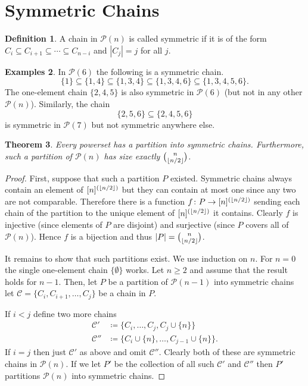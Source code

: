 \documentclass{report}
\DeclarePairedDelimiter\floor{\lfloor}{\rfloor}
\theoremstyle{definition}
\theoremstyle{plain}
\newtheorem{thm}{Theorem}[section]
\theoremstyle{definition}
\newtheorem{defn}[thm]{Definition}
\newtheorem{egs}[thm]{Examples}
\begin{document}
 	\section{Symmetric Chains}
 	\begin{defn}
 		A chain in $\mathcal{P}(n)$ is called symmetric if it is of the form $C_i \subseteq C_{i+1} \subseteq \cdots \subseteq C_{n-i}$ and $|C_j| = j$ for all $j$.
 	\end{defn}
 	\begin{egs}
 		In $\mathcal{P}(6)$ the following is a symmetric chain.
 		\[
 			\{1\} \subseteq \{1,4\}\subseteq \{1,3,4\}\subseteq \{1,3,4,6\}\subseteq \{1,3,4,5,6\}.
 		\]
 		The one-element chain $\{2,4,5\}$ is also symmetric in $\mathcal{P}(6)$ (but not in any other $\mathcal{P}(n)$). Similarly, the chain
 		\[
 			\{2,5,6\} \subseteq \{2,4,5,6\}
 		\]
 		is symmetric in $\mathcal{P}(7)$ but not symmetric anywhere else.
 	\end{egs}
 	\begin{thm}
 		Every powerset has a partition into symmetric chains. Furthermore, such a partition of $\mathcal{P}(n)$ has size exactly $\binom{n}{\floor{n/2}}$.
 	\end{thm}
 	\begin{proof}
 		First, suppose that such a partition $P$ existed. Symmetric chains always contain an element of $[n]^{(\floor{n/2})}$ but they can contain at most one since any two are not comparable. Therefore there is a function $f\colon P \to [n]^{(\floor{n/2})}$ sending each chain of the partition to the unique element of $[n]^{(\floor{n/2})}$ it contains. Clearly $f$ is injective (since elements of $P$ are disjoint) and surjective (since $P$ covers all of $\mathcal{P}(n)$). Hence $f$ is a bijection and thus $|P| = \binom{n}{\floor{n/2}}$.		
 		
 		
 		It remains to show that such partitions exist. We use induction on $n$. For $n = 0$ the single one-element chain $\{\emptyset\}$ works. Let $n\geq 2$ and assume that the result holds for $n-1$. Then, let $P$ be a partition of $\mathcal{P}(n-1)$ into symmetric chains let $\mathcal{C} = \{C_i,C_{i+1},\ldots, C_{j}\}$ be a chain in $P$.
 		
 		If $i<j$ define two more chains
 		\begin{align*}
 			\mathcal{C}'&\coloneqq \{C_i,\ldots,C_j,C_j \cup \{n\}\}\\
 			\mathcal{C}''&\coloneqq \{C_i\cup\{n\},\ldots, C_{j-1}\cup\{n\}\}.
 		\end{align*}
 		If $i=j$ then just $\mathcal{C'}$ as above and omit $\mathcal{C''}$. Clearly both of these are symmetric chains in $\mathcal{P}(n)$. If we let $P'$ be the collection of all such $\mathcal{C}'$ and $\mathcal{C}''$ then $P'$ partitions $\mathcal{P}(n)$ into symmetric chains.
 	\end{proof}
\end{document}
